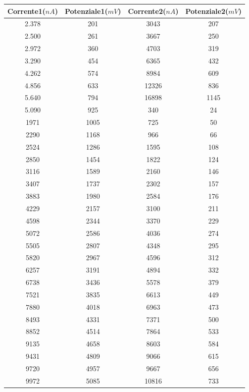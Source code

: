 \begin{center}
\begin{tabular}{*{4}{c}}
Corrente1($nA$) & Potenziale1($mV$) & Corrente2($nA$) & Potenziale2($mV$)\\
\midrule
2.378 & 201 & 3043 & 207\\
2.500 & 261 & 3667 & 250\\
2.972 & 360 & 4703 & 319\\
3.290 & 454 & 6365 & 432\\
4.262 & 574 & 8984 & 609\\
4.856 & 633 & 12326 & 836\\
5.640 & 794 & 16898 & 1145\\
5.090 & 925 & 340 & 24\\
1971 & 1005 & 725 & 50\\
2290 & 1168 & 966 & 66\\
2524 & 1286 & 1595 & 108\\
2850 & 1454 & 1822 & 124\\
3116 & 1589 & 2160 & 146\\
3407 & 1737 & 2302 & 157\\
3883 & 1980 & 2584 & 176\\
4229 & 2157 & 3100 & 211\\
4598 & 2344 & 3370 & 229\\
5072 & 2586 & 4036 & 274\\
5505 & 2807 & 4348 & 295\\
5820 & 2967 & 4596 & 312\\
6257 & 3191 & 4894 & 332\\
6738 & 3436 & 5578 & 379\\
7521 & 3835 & 6613 & 449\\
7880 & 4018 & 6963 & 473\\
8493 & 4331 & 7371 & 500\\
8852 & 4514 & 7864 & 533\\
9135 & 4658 & 8603 & 584\\
9431 & 4809 & 9066 & 615\\
9720 & 4957 & 9667 & 656\\
9972 & 5085 & 10816 & 733\\

\end{tabular}
\end{center}


